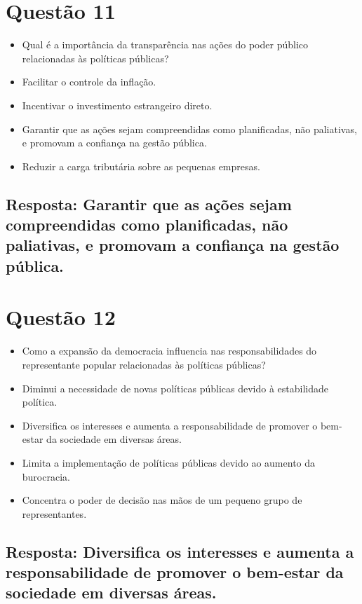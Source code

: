 \documentclass[
   article,       
   12pt,          
   oneside,       
   a4paper,       
   english,       
   brazil,        
   sumario=tradicional
   ]{abntex2}
\begin{document}
\section{Questão 11}
\begin{itemize}
    \item Qual é a importância da transparência nas ações do poder público relacionadas às políticas públicas?
    \item Facilitar o controle da inflação.
    \item Incentivar o investimento estrangeiro direto.
    \item Garantir que as ações sejam compreendidas como planificadas, não paliativas, e promovam a confiança na gestão pública.
    \item Reduzir a carga tributária sobre as pequenas empresas.
\end{itemize}
\subsection{Resposta: Garantir que as ações sejam compreendidas como planificadas, não paliativas, e promovam a confiança na gestão pública.}

\section{Questão 12}
\begin{itemize}
    \item Como a expansão da democracia influencia nas responsabilidades do representante popular relacionadas às políticas públicas?
    \item Diminui a necessidade de novas políticas públicas devido à estabilidade política.
    \item Diversifica os interesses e aumenta a responsabilidade de promover o bem-estar da sociedade em diversas áreas.
    \item Limita a implementação de políticas públicas devido ao aumento da burocracia.
    \item Concentra o poder de decisão nas mãos de um pequeno grupo de representantes.
\end{itemize}
\subsection{Resposta: Diversifica os interesses e aumenta a responsabilidade de promover o bem-estar da sociedade em diversas áreas.}
\end{document}
